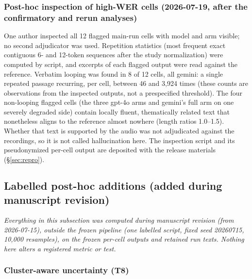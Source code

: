 \documentclass[11pt]{article}
\begin{document}
\subsubsection*{Post-hoc inspection of high-WER cells (2026-07-19, after the confirmatory and rerun analyses)}

One author inspected all 12 flagged main-run cells with model and arm visible; no second adjudicator was used. Repetition statistics (most frequent exact contiguous 6- and 12-token sequences after the study normalization) were computed by script, and excerpts of each flagged output were read against the reference. Verbatim looping was found in 8 of 12 cells, all gemini: a single repeated passage recurring, per cell, between 46 and 3{,}924 times (these counts are observations from the inspected outputs, not a prespecified threshold). The four non-looping flagged cells (the three gpt-4o arms and gemini's full arm on one severely degraded side) contain locally fluent, thematically related text that nonetheless aligns to the reference almost nowhere (length ratios 1.0--1.5). Whether that text is supported by the audio was not adjudicated against the recordings, so it is not called hallucination here. The inspection script and its pseudonymized per-cell output are deposited with the release materials (\S\ref{sec:repro}).

\subsection{Labelled post-hoc additions (added during manuscript revision)}
\label{sec:posthoc}

\emph{Everything in this subsection was computed during manuscript revision (from 2026-07-15), outside the frozen pipeline (one labelled script, fixed seed 20260715, 10{,}000 resamples), on the frozen per-cell outputs and retained run texts. Nothing here alters a registered metric or test.}

\subsubsection*{Cluster-aware uncertainty (T8)}
\end{document}
